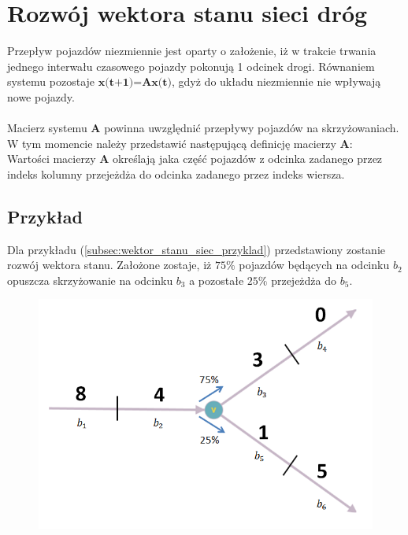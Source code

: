 \documentclass[12pt]{book}
\theoremstyle{plain}
\begin{document}
\section{Rozwój wektora stanu sieci dróg}
Przepływ pojazdów niezmiennie jest oparty o założenie, iż w trakcie trwania jednego interwału czasowego pojazdy pokonują 1 odcinek drogi. Równaniem systemu pozostaje $\textbf{x(t+1)=Ax(t)}$, gdyż do układu niezmiennie nie wpływają nowe pojazdy.\\ \\
Macierz systemu $\textbf{A}$ powinna uwzględnić przepływy pojazdów na skrzyżowaniach. W tym momencie należy przedstawić następującą definicję macierzy $\textbf{A}$:\\
Wartości macierzy \textbf{A} określają jaka część pojazdów z odcinka zadanego przez indeks kolumny przejeżdża do odcinka zadanego przez indeks wiersza.


\subsection{Przykład}
Dla przykładu (\ref{subsec:wektor_stanu_siec_przyklad}) przedstawiony zostanie rozwój wektora stanu. Założone zostaje, iż $75 \%$ pojazdów będących na odcinku $b_2$ opuszcza skrzyżowanie na odcinku $b_3$ a pozostałe $25 \%$ przejeżdża do $b_5$.

\begin{figure}[H]
	\centering
	\includegraphics[width=14cm]{3_single_road_lights}
	\caption{}
	\label{fig:3_single_road}
\end{figure}
\end{document}
